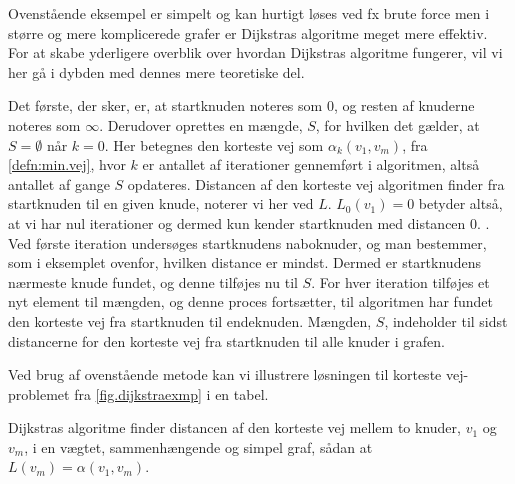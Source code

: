 Ovenstående eksempel er simpelt og kan hurtigt løses ved fx brute force men i større og mere komplicerede grafer er Dijkstras algoritme meget mere effektiv. For at skabe yderligere overblik over hvordan Dijkstras algoritme fungerer, vil vi her gå i dybden med dennes mere teoretiske del.

Det første, der sker, er, at startknuden noteres som $0$, og resten af knuderne noteres som $\infty$. Derudover oprettes en mængde, $S$, for hvilken det gælder, at $S = \emptyset$ når $k = 0$. Her betegnes den korteste vej som $\alpha_{k}(v_1,v_m)$, fra \autoref{defn:min.vej}, hvor $k$ er antallet af iterationer gennemført i algoritmen, altså antallet af gange $S$ opdateres. Distancen af den korteste vej algoritmen finder fra startknuden til en given knude, noterer vi her ved $L$. $L_{0}(v_1)=0$ betyder altså, at vi har nul iterationer og dermed kun kender startknuden med distancen $0$. . Ved første iteration undersøges startknudens naboknuder, og man bestemmer, som i eksemplet ovenfor, hvilken distance er mindst. Dermed er startknudens nærmeste knude fundet, og denne tilføjes nu til $S$. For hver iteration tilføjes et nyt element til mængden, og denne proces fortsætter, til algoritmen har fundet den korteste vej fra startknuden til endeknuden. Mængden, $S$, indeholder til sidst distancerne for den korteste vej fra startknuden til alle knuder i grafen. 

Ved brug af ovenstående metode kan vi illustrere løsningen til korteste vej-problemet fra \autoref{fig.dijkstraexmp} i en tabel.



\begin{thm} \label{thm:dijkstra}
Dijkstras algoritme finder distancen af den korteste vej mellem to knuder, $v_1$ og $v_m$, i en vægtet, sammenhængende og simpel graf, sådan at $L(v_m)=\alpha(v_1,v_m)$. 
\end{thm}

